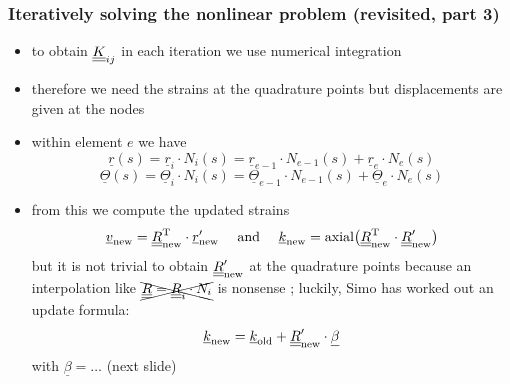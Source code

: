 \begin{frame}
  \frametitle{Iteratively solving the nonlinear problem (revisited, part 3)}

  \begin{itemize}
    \item to obtain $\underline{\underline{K}}_{ij}$ in each iteration we use numerical integration
    \item therefore we need the strains at the quadrature points \newline
      but displacements are given at the nodes
    \item within element $e$ we have
      \begin{displaymath}
        \underline{r}(s) = \underline{r}_i \cdot N_i(s) = \underline{r}_{e-1} \cdot N_{e-1}(s) + \underline{r}_e \cdot N_e(s)
      \end{displaymath}
      \begin{displaymath}
        \underline{\Theta}(s) = \underline{\Theta}_i \cdot N_i(s) = \underline{\Theta}_{e-1} \cdot N_{e-1}(s) + \underline{\Theta}_e \cdot N_e(s)
      \end{displaymath}
    \item from this we compute the updated strains
      \begin{displaymath}
        \underline{v}_{\text{new}} = \underline{\underline{R}}_{\text{new}}^{\mathrm{T}} \cdot \underline{r}_{\text{new}}^{\prime}
        \quad \text{ and } \quad
        \underline{k}_{\text{new}} = \mathrm{axial} \bigl( \underline{\underline{R}}_{\text{new}}^{\mathrm{T}} \cdot \underline{\underline{R}}_{\text{new}}^{\prime} \bigr)
      \end{displaymath}
      but it is not trivial to obtain $\underline{\underline{R}}_{\text{new}}^{\prime}$ at the quadrature points \newline
      because an interpolation like $\xcancel{\underline{\underline{R}} = \underline{\underline{R}}_i \cdot N_i}$ is nonsense ;
      luckily, Simo has worked out an update formula:
      \begin{displaymath}
        \underline{k}_{\text{new}} = \underline{k}_{\text{old}} + \underline{\underline{R}}_{\text{new}}^{\prime} \cdot \underline{\beta}
      \end{displaymath}
      with $\underline{\beta} = \dots$ (next slide)
  \end{itemize}

\end{frame}


